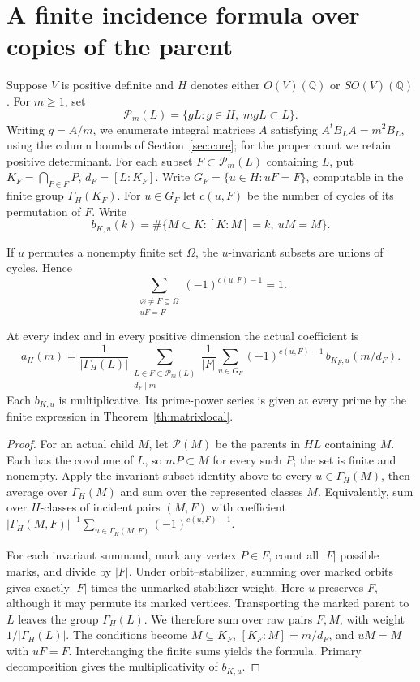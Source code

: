\section{A finite incidence formula over copies of the parent}\label{sec:inc}

Suppose $V$ is positive definite and $H$ denotes either
$O(V)(\mathbb Q)$ or $SO(V)(\mathbb Q)$. For $m\ge1$, set
\[
 \mathcal P_m(L)=\{gL:g\in H,\; mgL\subset L\}.
\]
Writing \(g=A/m\), we enumerate integral
matrices \(A\) satisfying \(A^tB_LA=m^2B_L\), using the column
bounds of Section~\ref{sec:core}; for the proper count we retain
positive determinant. For each subset \(F\subset\mathcal P_m(L)\) containing \(L\), put \(K_F=\bigcap_{P\in F}P\), \(d_F=[L:K_F]\). Write \(G_F=\{u\in H:uF=F\}\), computable in the finite group \(\Gamma_H(K_F)\). For \(u\in G_F\) let \(c(u,F)\) be the number of cycles of its permutation of \(F\). Write
\[
 b_{K,u}(k)=\#\{M\subset K:[K:M]=k,\ uM=M\}.
\]

If $u$ permutes a nonempty finite set $\Omega$, the $u$-invariant
subsets are unions of cycles. Hence
\[
 \sum_{\substack{\varnothing\ne F\subseteq\Omega\\uF=F}}
 (-1)^{c(u,F)-1}=1.
\]
\begin{theorem}\label{th:incidence}
At every index and in every positive dimension the actual coefficient is
\[
 a_H(m)=\frac1{|\Gamma_H(L)|}
  \sum_{\substack{L\in F\subset\mathcal P_m(L)\\ d_F\mid m}}
  \frac1{|F|}\sum_{u\in G_F}(-1)^{c(u,F)-1}\, b_{K_F,u}(m/d_F).
\]
Each \(b_{K,u}\) is multiplicative. Its prime-power series is given at every prime by the finite expression in Theorem~\ref{th:matrixlocal}.
\end{theorem}
\begin{proof}
For an actual child \(M\), let \(\mathcal P(M)\) be the parents in \(H L\) containing \(M\). Each has the covolume of \(L\), so \(mP\subset M\) for every such \(P\); the set is finite and nonempty. Apply the invariant-subset identity above to every \(u\in\Gamma_H(M)\), then average over \(\Gamma_H(M)\) and sum over the represented classes \(M\). Equivalently, sum over \(H\)-classes of incident pairs \((M,F)\) with coefficient
\(
 |\Gamma_H(M,F)|^{-1}\sum_{u\in\Gamma_H(M,F)}(-1)^{c(u,F)-1}.
\)

For each invariant summand, mark any vertex \(P\in F\), count all \(|F|\) possible marks, and divide by \(|F|\). Under orbit--stabilizer, summing over marked orbits gives exactly \(|F|\) times the unmarked stabilizer weight. Here \(u\) preserves \(F\), although it may permute its marked vertices. Transporting the marked parent to \(L\) leaves the group
\(\Gamma_H(L)\). We therefore sum over raw pairs \(F,M\),
with weight \(1/|\Gamma_H(L)|\). The conditions become \(M\subseteq K_F\), \([K_F:M]=m/d_F\), and \(uM=M\) with \(uF=F\). Interchanging the finite sums yields the formula. Primary decomposition gives the multiplicativity of \(b_{K,u}\).
\end{proof}

